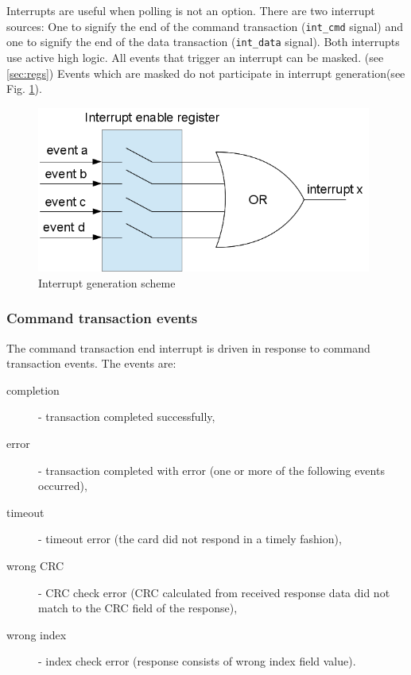     Interrupts are useful when polling is not an option. There are two interrupt sources: One to signify the end of the command transaction (\texttt{int\_cmd} signal) and
    one to signify the end of the data transaction (\texttt{int\_data} signal). Both interrupts use active high logic. All events that trigger an interrupt can be masked. (see \ref{sec:regs})
    Events which are masked do not participate in interrupt generation(see Fig. \ref{img:events}).
    \begin{figure}[H]
        \centering
        \includegraphics[width=11cm]{../bin/events.png}
        \caption{Interrupt generation scheme}
        \label{img:events}
    \end{figure}
    
    \subsubsection{Command transaction events}
    \label{sec:cmd_events}

    The command transaction end interrupt is driven in response to command transaction events. The events are:
    \begin{description}
    \item[completion] - transaction completed successfully,
    \item[error] - transaction completed with error (one or more of the following events occurred),
    \item[timeout] - timeout error (the card did not respond in a timely fashion),
    \item[wrong CRC] - CRC check error (CRC calculated from received response data did not match to the CRC field of the response),
    \item[wrong index] - index check error (response consists of wrong index field value).
    \end{description}
    
